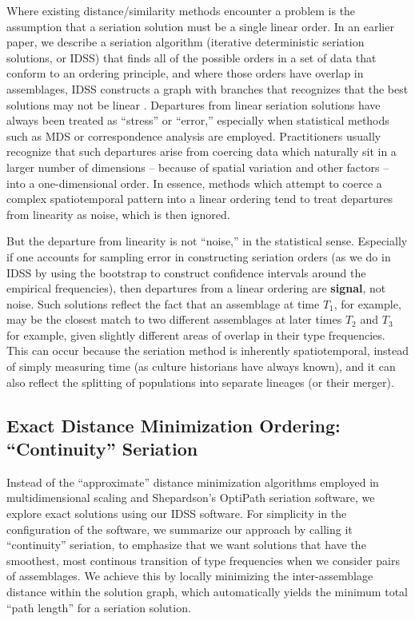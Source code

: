 \documentclass[graybox,natbib]{svmult}
\begin{document}
Where existing distance/similarity methods encounter a problem is the
assumption that a seriation solution must be a single linear order. In
an earlier paper, we describe a seriation algorithm (iterative
deterministic seriation solutions, or IDSS) that finds all of the
possible orders in a set of data that conform to an ordering principle,
and where those orders have overlap in assemblages, IDSS constructs a
graph with branches that recognizes that the best solutions may not be
linear \citep{lipomadsendunnell2015}. Departures from linear seriation
solutions have always been treated as ``stress'' or ``error,''
especially when statistical methods such as MDS or correspondence
analysis are employed. Practitioners usually recognize that such
departures arise from coercing data which naturally sit in a larger
number of dimensions -- because of spatial variation and other factors
-- into a one-dimensional order. In essence, methods which attempt to
coerce a complex spatiotemporal pattern into a linear ordering tend to
treat departures from linearity as noise, which is then ignored.

But the departure from linearity is not ``noise,'' in the statistical
sense. Especially if one accounts for sampling error in constructing
seriation orders (as we do in IDSS by using the bootstrap to construct
confidence intervals around the empirical frequencies), then departures
from a linear ordering are \textbf{signal}, not noise. Such solutions
reflect the fact that an assemblage at time \(T_1\), for example, may be
the closest match to two different assemblages at later times \(T_2\)
and \(T_3\) for example, given slightly different areas of overlap in
their type frequencies. This can occur because the seriation method is
inherently spatiotemporal, instead of simply measuring time (as culture
historians have always known), and it can also reflect the splitting of
populations into separate lineages (or their merger).

\subsection{\texorpdfstring{Exact Distance Minimization Ordering:
``Continuity''
Seriation}{Exact Distance Minimization Ordering: Continuity Seriation}}\label{exact-distance-minimization-ordering-continuity-seriation}

Instead of the ``approximate'' distance minimization algorithms employed
in multidimensional scaling and Shepardson's OptiPath seriation
software, we explore exact solutions using our IDSS software. For
simplicity in the configuration of the software, we summarize our
approach by calling it ``continuity'' seriation, to emphasize that we
want solutions that have the smoothest, most continous transition of
type frequencies when we consider pairs of assemblages. We achieve this
by locally minimizing the inter-assemblage distance within the solution
graph, which automatically yields the minimum total ``path length'' for
a seriation solution.
\end{document}
